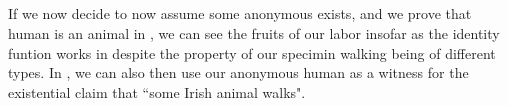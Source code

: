 \begin{code}%
\>[0]\AgdaSpace{}%
\AgdaSymbol{:}\AgdaSpace{}%
\AgdaSpace{}%
\AgdaSpace{}%
\AgdaSpace{}%
\AgdaSpace{}%
\AgdaSpace{}%
\AgdaSpace{}%
\<%
\\
\>[0]\AgdaSpace{}%
\AgdaSymbol{(}\AgdaSpace{}%
\AgdaSpace{}%
\AgdaSpace{}%
\AgdaOperator{\AgdaInductiveConstructor{,}}\AgdaSpace{}%
\AgdaSymbol{)}\AgdaSpace{}%
\AgdaSymbol{=}\AgdaSpace{}%
\AgdaSymbol{(}\AgdaSpace{}%
\AgdaSymbol{(}\AgdaSpace{}%
\AgdaSymbol{)}\AgdaSpace{}%
\AgdaSymbol{)}\AgdaSpace{}%
\AgdaOperator{\AgdaInductiveConstructor{,}}\AgdaSpace{}%
\<%
\\
%
\\[\AgdaEmptyExtraSkip]%
\>[0]\AgdaSpace{}%
\AgdaSymbol{:}\AgdaSpace{}%
\AgdaSpace{}%
\AgdaSpace{}%
\AgdaSpace{}%
\AgdaSpace{}%
\AgdaSpace{}%
\AgdaSpace{}%
\<%
\\
\>[0]\AgdaSpace{}%
\AgdaSymbol{(}\AgdaSpace{}%
\AgdaSpace{}%
\AgdaSpace{}%
\AgdaOperator{\AgdaInductiveConstructor{,}}\AgdaSpace{}%
\AgdaSymbol{)}\AgdaSpace{}%
\AgdaSymbol{=}\AgdaSpace{}%
\AgdaSymbol{(}\AgdaSpace{}%
\AgdaSymbol{)}\AgdaSpace{}%
\AgdaOperator{\AgdaInductiveConstructor{,}}\AgdaSpace{}%
\<%
\end{code}

If we now decide to now assume some anonymous  exists, and we
prove that human is an animal in , we can see the fruits of
our labor insofar as the identity funtion works in  despite the
property of our specimin walking being of different types. In , we
can also then use our anonymous human as a witness for the existential claim
that ``some Irish animal walks".

